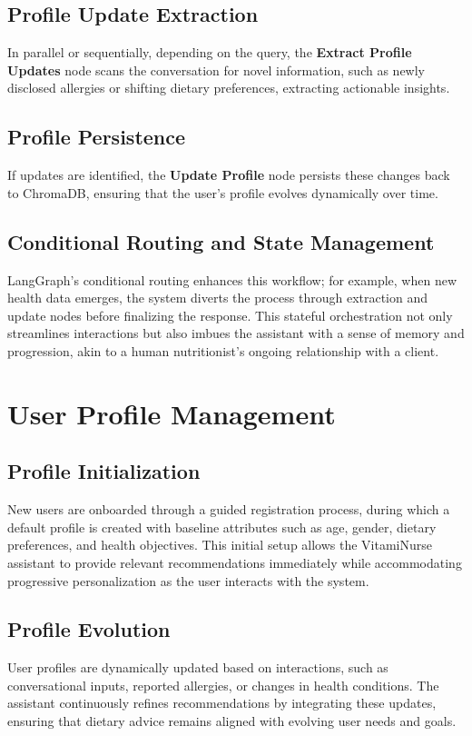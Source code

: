 \subsection{Profile Update Extraction}
In parallel or sequentially, depending on the query, the \textbf{Extract Profile Updates} node scans the conversation for novel information, such as newly disclosed allergies or shifting dietary preferences, extracting actionable insights.

\subsection{Profile Persistence}
If updates are identified, the \textbf{Update Profile} node persists these changes back to ChromaDB, ensuring that the user's profile evolves dynamically over time.

\subsection{Conditional Routing and State Management}
LangGraph's conditional routing enhances this workflow; for example, when new health data emerges, the system diverts the process through extraction and update nodes before finalizing the response. This stateful orchestration not only streamlines interactions but also imbues the assistant with a sense of memory and progression, akin to a human nutritionist's ongoing relationship with a client.

\section{User Profile Management}

\subsection{Profile Initialization}
New users are onboarded through a guided registration process, during which a default profile is created with baseline attributes such as age, gender, dietary preferences, and health objectives. This initial setup allows the VitamiNurse assistant to provide relevant recommendations immediately while accommodating progressive personalization as the user interacts with the system.

\subsection{Profile Evolution}
User profiles are dynamically updated based on interactions, such as conversational inputs, reported allergies, or changes in health conditions. The assistant continuously refines recommendations by integrating these updates, ensuring that dietary advice remains aligned with evolving user needs and goals.

